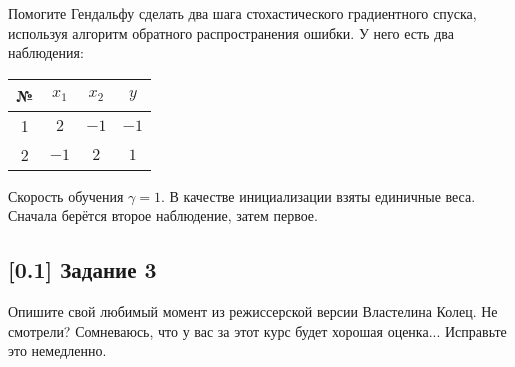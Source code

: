 \documentclass[12pt, a4paper, oneside]{article}
\begin{document}
Помогите Гендальфу сделать два шага стохастического градиентного спуска, используя алгоритм обратного распространения ошибки. У него есть два наблюдения: 

\begin{center}
    \begin{tabular}{cccc} 
        № & $x_1$ & $x_2$ & $y$ \\ \hline 
        1 & $2$ & $-1$ & $-1$ \\ 
        2 & $-1$ & $2$ & $1$ \\ \hline 
    \end{tabular}
\end{center}

Скорость обучения $\gamma = 1$. В качестве инициализации взяты единичные веса. Сначала берётся второе наблюдение, затем первое.

\vspace{-0.5cm}
\subsection*{[0.1] Задание 3}
\vspace{-0.5cm}

Опишите свой любимый момент из режиссерской версии Властелина Колец. Не смотрели? Сомневаюсь, что у вас за этот курс будет хорошая оценка... Исправьте это немедленно. 
\end{document}
